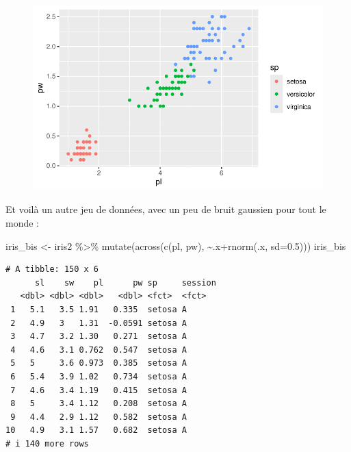 \documentclass[
  letterpaper,
  DIV=11,
  numbers=noendperiod]{scrreprt}
\newenvironment{Shaded}{\begin{snugshade}}{\end{snugshade}}
\newcommand{\AttributeTok}[1]{\textcolor[rgb]{0.40,0.45,0.13}{#1}}
\newcommand{\FloatTok}[1]{\textcolor[rgb]{0.68,0.00,0.00}{#1}}
\newcommand{\FunctionTok}[1]{\textcolor[rgb]{0.28,0.35,0.67}{#1}}
\newcommand{\NormalTok}[1]{\textcolor[rgb]{0.00,0.23,0.31}{#1}}
\newcommand{\OtherTok}[1]{\textcolor[rgb]{0.00,0.23,0.31}{#1}}
\newcommand{\SpecialCharTok}[1]{\textcolor[rgb]{0.37,0.37,0.37}{#1}}
\begin{document}
\begin{figure}[H]

{\centering \includegraphics{ggplot2_files/figure-pdf/unnamed-chunk-31-1.pdf}

}

\end{figure}

Et voilà un autre jeu de données, avec un peu de bruit gaussien pour
tout le monde :

\begin{Shaded}
\begin{Highlighting}[]
\NormalTok{iris\_bis }\OtherTok{\textless{}{-}}\NormalTok{ iris2 }\SpecialCharTok{\%\textgreater{}\%} \FunctionTok{mutate}\NormalTok{(}\FunctionTok{across}\NormalTok{(}\FunctionTok{c}\NormalTok{(pl, pw), }\SpecialCharTok{\textasciitilde{}}\NormalTok{.x}\SpecialCharTok{+}\FunctionTok{rnorm}\NormalTok{(.x, }\AttributeTok{sd=}\FloatTok{0.5}\NormalTok{)))}
\NormalTok{iris\_bis}
\end{Highlighting}
\end{Shaded}

\begin{verbatim}
# A tibble: 150 x 6
      sl    sw    pl      pw sp     session
   <dbl> <dbl> <dbl>   <dbl> <fct>  <fct>  
 1   5.1   3.5 1.91   0.335  setosa A      
 2   4.9   3   1.31  -0.0591 setosa A      
 3   4.7   3.2 1.30   0.271  setosa A      
 4   4.6   3.1 0.762  0.547  setosa A      
 5   5     3.6 0.973  0.385  setosa A      
 6   5.4   3.9 1.02   0.734  setosa A      
 7   4.6   3.4 1.19   0.415  setosa A      
 8   5     3.4 1.12   0.208  setosa A      
 9   4.4   2.9 1.12   0.582  setosa A      
10   4.9   3.1 1.57   0.682  setosa A      
# i 140 more rows
\end{verbatim}
\end{document}
